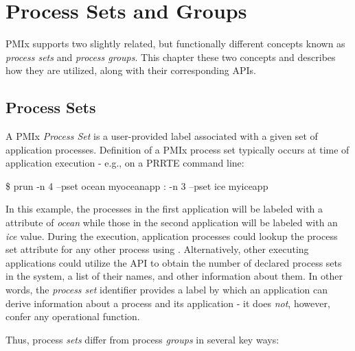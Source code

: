 \chapter{Process Sets and Groups}
\label{chap:api_sets_groups}

\ac{PMIx} supports two slightly related, but functionally different concepts known as \emph{process sets} and \emph{process groups}. This chapter these two concepts and describes how they are utilized, along with their corresponding \acp{API}.

\section{Process Sets}
\label{chap:api_sets_groups:sets}

A \ac{PMIx} \emph{Process Set} is a user-provided label associated with a given set of application processes. Definition of a \ac{PMIx} process set typically occurs at time of application execution - e.g., on a \ac{PRRTE} command line:

\cspecificstart
\begin{codepar}
\$ prun -n 4 --pset ocean myoceanapp : -n 3 --pset ice myiceapp
\end{codepar}
\cspecificend

In this example, the processes in the first application will be labeled with a  attribute of \emph{ocean} while those in the second application will be labeled with an \emph{ice} value. During the execution, application processes could lookup the process set attribute for any other process using . Alternatively, other executing applications could utilize the  \ac{API} to obtain the number of declared process sets in the system, a list of their names, and other information about them. In other words, the \emph{process set} identifier provides a label by which an application can derive information about a process and its application - it does \emph{not}, however, confer any operational function.

Thus, process \emph{sets} differ from process \emph{groups} in several key ways:

